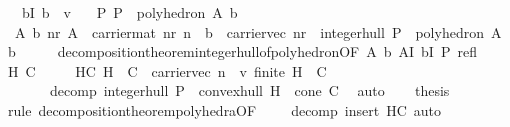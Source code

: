 \begin{isabellebody}
\ \ \ bI{\isacharcolon}{\kern0pt}\ {\isachardoublequoteopen}b\ {\isasymin}\ {\isasymint}\isactrlsub v{\isachardoublequoteclose}\isanewline
\ \ \ P{\isacharcolon}{\kern0pt}\ {\isachardoublequoteopen}P\ {\isacharequal}{\kern0pt}\ polyhedron\ A\ b{\isachardoublequoteclose}\isanewline
{}\ {\isachardoublequoteopen}{\isasymexists}\ A{\isacharprime}{\kern0pt}\ b{\isacharprime}{\kern0pt}\ nr{\isacharprime}{\kern0pt}{\isachardot}{\kern0pt}\ A{\isacharprime}{\kern0pt}\ {\isasymin}\ carrier{\isacharunderscore}{\kern0pt}mat\ nr{\isacharprime}{\kern0pt}\ n\ {\isasymand}\ b{\isacharprime}{\kern0pt}\ {\isasymin}\ carrier{\isacharunderscore}{\kern0pt}vec\ nr{\isacharprime}{\kern0pt}\ {\isasymand}\ integer{\isacharunderscore}{\kern0pt}hull\ P\ {\isacharequal}{\kern0pt}\ polyhedron\ A{\isacharprime}{\kern0pt}\ b{\isacharprime}{\kern0pt}{\isachardoublequoteclose}\isanewline
%
\isadelimproof
%
\endisadelimproof
%
\isatagproof
{}\isamarkupfalse%
\ {\isacharminus}{\kern0pt}\isanewline
\ \ \isamarkupfalse%
\ decomposition{\isacharunderscore}{\kern0pt}theorem{\isacharunderscore}{\kern0pt}integer{\isacharunderscore}{\kern0pt}hull{\isacharunderscore}{\kern0pt}of{\isacharunderscore}{\kern0pt}polyhedron{\isacharbrackleft}{\kern0pt}OF\ A\ b\ AI\ bI\ P\ refl{\isacharbrackright}{\kern0pt}\isanewline
\ \ \isamarkupfalse%
\ H\ C\isanewline
\ \ \ \ \ HC{\isacharcolon}{\kern0pt}\ {\isachardoublequoteopen}H\ {\isasymunion}\ C\ {\isasymsubseteq}\ carrier{\isacharunderscore}{\kern0pt}vec\ n\ {\isasyminter}\ {\isasymint}\isactrlsub v{\isachardoublequoteclose}\ {\isachardoublequoteopen}finite\ {\isacharparenleft}{\kern0pt}H\ {\isasymunion}\ C{\isacharparenright}{\kern0pt}{\isachardoublequoteclose}\ \isanewline
\ \ \ \ \ \ \ decomp{\isacharcolon}{\kern0pt}\ {\isachardoublequoteopen}integer{\isacharunderscore}{\kern0pt}hull\ P\ {\isacharequal}{\kern0pt}\ convex{\isacharunderscore}{\kern0pt}hull\ H\ {\isacharplus}{\kern0pt}\ cone\ C{\isachardoublequoteclose}\ \isamarkupfalse%
\ auto\isanewline
\ \ \isamarkupfalse%
\ {\isacharquery}{\kern0pt}thesis\isanewline
\ \ \ \ \isamarkupfalse%
\ {\isacharparenleft}{\kern0pt}rule\ decomposition{\isacharunderscore}{\kern0pt}theorem{\isacharunderscore}{\kern0pt}polyhedra{\isacharunderscore}{\kern0pt}{}{\isacharbrackleft}{\kern0pt}OF\ {\isacharunderscore}{\kern0pt}\ {\isacharunderscore}{\kern0pt}\ {\isacharunderscore}{\kern0pt}\ {\isacharunderscore}{\kern0pt}\ decomp{\isacharbrackright}{\kern0pt}{\isacharcomma}{\kern0pt}\ insert\ HC{\isacharcomma}{\kern0pt}\ auto{\isacharparenright}{\kern0pt}\isanewline

\end{isabellebody}
